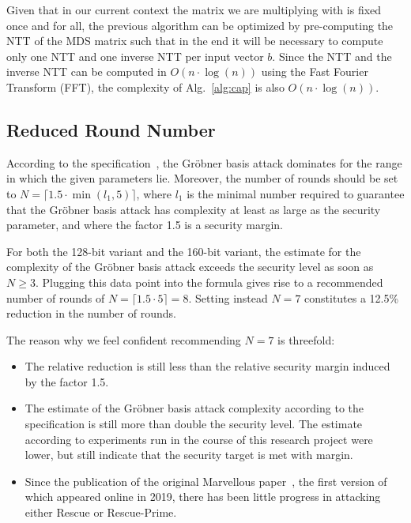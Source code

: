 \documentclass[a4paper]{article}
\begin{document}
Given that in our current context the matrix we are multiplying with is fixed once and for all, the previous algorithm can be optimized by pre-computing the NTT of the MDS matrix such that in the end it will be necessary to compute only one NTT and one inverse NTT per input vector $b$. Since the NTT and the inverse NTT can be computed in $O(n \cdot\log(n))$ using the Fast Fourier Transform (FFT), the complexity of Alg.~\ref{alg:cap} is also $O(n \cdot\log(n))$.

\subsection{Reduced Round Number}
\label{section:round-number}

According to the specification~\cite{cryptoeprint:2020/1143}, the Gröbner basis attack dominates for the range in which the given parameters lie. Moreover, the number of rounds should be set to $N = \lceil 1.5 \cdot \min(l_1, 5)\rceil$, where $l_1$ is the minimal number required to guarantee that the Gröbner basis attack has complexity at least as large as the security parameter, and where the factor 1.5 is a security margin.

For both the 128-bit variant and the 160-bit variant, the estimate for the complexity of the Gröbner basis attack exceeds the security level as soon as $N \geq 3$. Plugging this data point into the formula gives rise to a recommended number of rounds of $N = \lceil 1.5 \cdot 5 \rceil = 8$. Setting instead $N=7$ constitutes a 12.5\% reduction in the number of rounds.

The reason why we feel confident recommending $N=7$ is threefold:
\begin{itemize}
 \item The relative reduction is still less than the relative security margin induced by the factor 1.5.
 \item The estimate of the Gröbner basis attack complexity according to the specification is still more than double the security level. The estimate according to experiments run in the course of this research project were lower, but still indicate that the security target is met with margin.
 \item Since the publication of the original Marvellous paper~\cite{cryptoeprint:2019/426}, the first version of which appeared online in 2019, there has been little progress in attacking either Rescue or Rescue-Prime.
\end{itemize}
 
\end{document}
